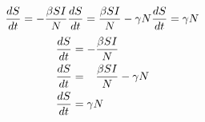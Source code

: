 \documentclass{minimal}%
\begin{document}

\[
  \frac{dS}{dt} = -\frac{\beta S I}{N}\\
  \frac{dS}{dt} = \frac{\beta S I}{N} - \gamma N\\
  \frac{dS}{dt} = \gamma N
\]
\begin{align}
  \frac{dS}{dt} &= -\frac{\beta S I}{N}\\
  \frac{dS}{dt} &= \hphantom{-} \frac{\beta S I}{N} - \gamma N\\
  \frac{dS}{dt} &= \gamma N
\end{align}
\end{document}
